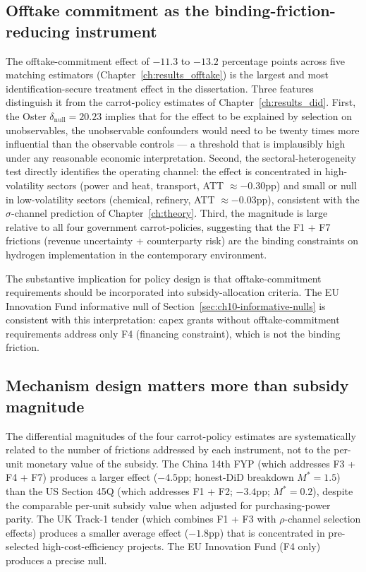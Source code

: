 \subsection{Offtake commitment as the binding-friction-reducing instrument}
\label{sec:ch10-substantive-offtake}

The offtake-commitment effect of $-11.3$ to $-13.2$ percentage points across five matching estimators (Chapter~\ref{ch:results_offtake}) is the largest and most identification-secure treatment effect in the dissertation. Three features distinguish it from the carrot-policy estimates of Chapter~\ref{ch:results_did}. First, the Oster $\delta_{\text{null}} = 20.23$ implies that for the effect to be explained by selection on unobservables, the unobservable confounders would need to be twenty times more influential than the observable controls --- a threshold that is implausibly high under any reasonable economic interpretation. Second, the sectoral-heterogeneity test directly identifies the operating channel: the effect is concentrated in high-volatility sectors (power and heat, transport, ATT $\approx -0.30$pp) and small or null in low-volatility sectors (chemical, refinery, ATT $\approx -0.03$pp), consistent with the $\sigma$-channel prediction of Chapter~\ref{ch:theory}. Third, the magnitude is large relative to all four government carrot-policies, suggesting that the F1 + F7 frictions (revenue uncertainty + counterparty risk) are the binding constraints on hydrogen implementation in the contemporary environment.

The substantive implication for policy design is that offtake-commitment requirements should be incorporated into subsidy-allocation criteria. The EU Innovation Fund informative null of Section~\ref{sec:ch10-informative-nulls} is consistent with this interpretation: capex grants without offtake-commitment requirements address only F4 (financing constraint), which is not the binding friction.

\subsection{Mechanism design matters more than subsidy magnitude}
\label{sec:ch10-substantive-mechanism-design}

The differential magnitudes of the four carrot-policy estimates are systematically related to the number of frictions addressed by each instrument, not to the per-unit monetary value of the subsidy. The China 14th FYP (which addresses F3 + F4 + F7) produces a larger effect ($-4.5$pp; honest-DiD breakdown $M^* = 1.5$) than the US Section 45Q (which addresses F1 + F2; $-3.4$pp; $M^* = 0.2$), despite the comparable per-unit subsidy value when adjusted for purchasing-power parity. The UK Track-1 tender (which combines F1 + F3 with $\rho$-channel selection effects) produces a smaller average effect ($-1.8$pp) that is concentrated in pre-selected high-cost-efficiency projects. The EU Innovation Fund (F4 only) produces a precise null.

